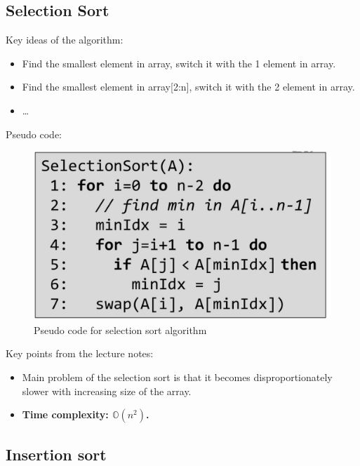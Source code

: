 \documentclass[a4paper,
  twoside, %
  headlines=2.1 %
  ]{scrartcl}
\begin{document}
    \subsection*{Selection Sort}

    Key ideas of the algorithm: 
    \begin{itemize}
        \item Find the smallest element in array, switch it with the 1 element in array.
        \item Find the smallest element in array[2:n], switch it with the 2 element in array.
        \item \dots{}
    \end{itemize}
    Pseudo code:
    \begin{figure}[H]
        \centering
        \includegraphics[width=0.3\linewidth]{image.png}
        \caption{Pseudo code for selection sort algorithm}
        \label{fig:enter-label}
    \end{figure}
    Key points from the lecture notes:
    \begin{itemize}
       \item  Main problem of the selection sort is that it becomes disproportionately slower with increasing size of the array.
       \item \textbf{Time complexity: $\mathbb{O}(n^{2})$.}
    \end{itemize}

    \clearpage
    \subsection*{Insertion sort}
\end{document}
